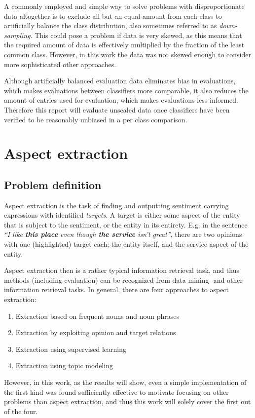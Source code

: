 \documentclass[a4paper,11pt]{kth-mag}
\begin{document}
A commonly employed and simple way to solve problems with disproportionate data altogether is to exclude all but an equal amount from each class to artificially balance the class distribution, also sometimes referred to as \emph{down-sampling}\cite{provost2000machine}. This could pose a problem if data is very skewed, as this means that the required amount of data is effectively multiplied by the fraction of the least common class. However, in this work the data was not skewed enough to consider more sophisticated other approaches.

Although artificially balanced evaluation data eliminates bias in evaluations, which makes evaluations between classifiers more comparable, it also reduces the amount of entries used for evaluation, which makes evaluations less informed. Therefore this report will evaluate unscaled data once classifiers have been verified to be reasonably unbiased in a per class comparison.


\chapter{Aspect extraction}

\section{Problem definition}
Aspect extraction is the task of finding and outputting sentiment carrying expressions with identified \emph{targets}. A target is either some aspect of the entity that is subject to the sentiment, or the entity in its entirety. E.g. in the sentence \emph{``I like \textbf{this place} even though \textbf{the service} isn't great''},  there are two opinions with one (highlighted) target each; the entity itself, and the service-aspect of the entity.

Aspect extraction then is a rather typical information retrieval task, and thus methods (including evaluation) can be recognized from data mining- and other information retrieval tasks. In general, there are four approaches to aspect extraction\cite[chapter 5.3]{liu2012sentiment}:

\begin{enumerate}
\item Extraction based on frequent nouns and noun phrases
\item Extraction by exploiting opinion and target relations
\item Extraction using supervised learning
\item Extraction using topic modeling
\end{enumerate}
However, in this work, as the results will show, even a simple implementation of the first kind was found sufficiently effective to motivate focusing on other problems than aspect extraction, and thus this work will solely cover the first out of the four.
\end{document}
